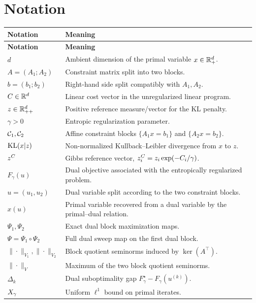 \section{Notation}
\label{app:notation}

\renewcommand{\arraystretch}{1.12}
\begin{longtable}{@{}p{}p{}@{}}
\toprule
\textbf{Notation} & \textbf{Meaning} \\
\midrule
\endfirsthead

\toprule
\textbf{Notation} & \textbf{Meaning} \\
\midrule
\endhead

$d$ & Ambient dimension of the primal variable $x\in\mathbb{R}^d_+$. \\
$A=(A_1;A_2)$ & Constraint matrix split into two blocks. \\
$b=(b_1;b_2)$ & Right-hand side split compatibly with $A_1,A_2$. \\
$C\in\mathbb{R}^d$ & Linear cost vector in the unregularized linear program. \\
$z\in\mathbb{R}^d_{++}$ & Positive reference measure/vector for the KL penalty. \\
$\gamma>0$ & Entropic regularization parameter. \\
$\mathcal{C}_1,\mathcal{C}_2$ & Affine constraint blocks $\{A_1x=b_1\}$ and $\{A_2x=b_2\}$. \\
$\mathrm{KL}(x|z)$ & Non-normalized Kullback--Leibler divergence from $x$ to $z$. \\
$z^C$ & Gibbs reference vector, $z^C_i=z_i\exp(-C_i/\gamma)$. \\
$F_\gamma(u)$ & Dual objective associated with the entropically regularized problem. \\
$u=(u_1,u_2)$ & Dual variable split according to the two constraint blocks. \\
$x(u)$ & Primal variable recovered from a dual variable by the primal--dual relation. \\
$\Psi_1,\Psi_2$ & Exact dual block maximization maps. \\
$\Psi=\Psi_1\circ\Psi_2$ & Full dual sweep map on the first dual block. \\
$\|\cdot\|_{V_1},\|\cdot\|_{V_2}$ & Block quotient seminorms induced by $\ker(A^\top)$. \\
$\|\cdot\|_V$ & Maximum of the two block quotient seminorms. \\
$\Delta_k$ & Dual suboptimality gap $F_\gamma^\star-F_\gamma(u^{(k)})$. \\
$X_\gamma$ & Uniform $\ell^1$ bound on primal iterates. \\

\end{longtable}
